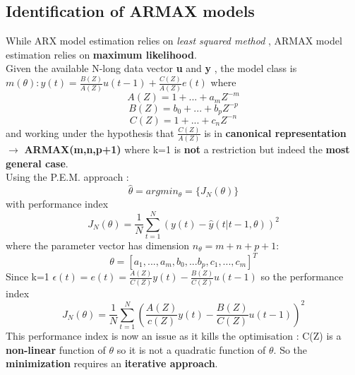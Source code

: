 \subsection{Identification of ARMAX models}
While ARX model estimation relies on \textit{least squared method} , ARMAX model estimation relies on \textbf{maximum likelihood}.\\
Given the available N-long data vector \textbf{u} and \textbf{y} , the model class is $m(\theta): y(t) = \frac{B(Z)}{A(Z)}u(t-1) + \frac{C(Z)}{A(Z)}e(t)$ where 
$$A(Z) = 1+ ...+a_mZ^{-m} $$
$$B(Z) = b_0+...+b_pZ^{-p}$$
$$C(Z) = 1+...+c_nZ^{-n}$$
and working under the hypothesis that $\frac{C(Z)}{A(Z)}$ is in \textbf{canonical representation} $\to$ \textbf{ARMAX(m,n,p+1)} where k=1 is \textbf{not} a restriction but indeed the \textbf{most general case}.\\
Using the P.E.M. approach : $$ \hat{\theta} = argmin_{\theta}=\{J_N(\theta)\}$$
with performance index $$J_N(\theta) = \frac{1}{N} \sum\limits_{t=1}^{N}(y(t)-\hat{y}(t|t-1,\theta))^2$$ where the parameter vector has dimension $n_{\theta}=m+n+p+1$: $$ \theta =[a_1,...,a_m,b_0,...b_p,c_1,...,c_m]^T $$
Since k=1 $\epsilon(t)= e(t)= \frac{A(Z)}{C(Z)}y(t)-\frac{B(Z)}{C(Z)}u(t-1)$ so the performance index $$ J_N(\theta) = \frac{1}{N} \sum\limits_{t=1}^{N}(\frac{A(Z)}{c(Z)}y(t) -  \frac{B(Z)}{C(Z)}u(t-1))^2$$
This performance index is now an issue as it kills the optimisation : C(Z) is a \textbf{non-linear} function of $\theta$ so it is not a quadratic function of $\theta$. So the \textbf{minimization} requires an \textbf{iterative approach}.

